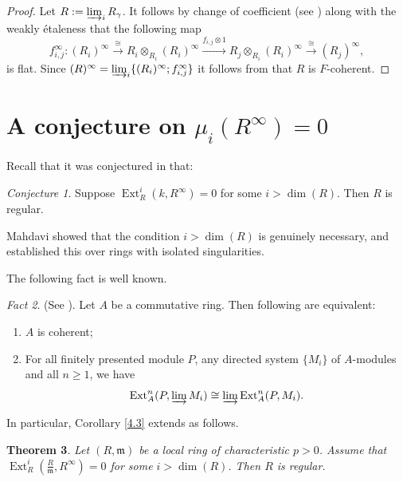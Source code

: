 \documentclass[11pt,a4paper]{amsart}
\numberwithin{equation}{section}
\newtheorem{theorem}{Theorem}[section]
\theoremstyle{definition}
\theoremstyle{remark}
\newtheorem{fact}[theorem]{Fact}
\newtheorem{conjecture}[theorem]{Conjecture}
\newcommand{\Ext}{\operatorname{Ext}}
\newcommand{\vil}{\operatornamewithlimits{\varinjlim}}
\newcommand{\lo}{\longrightarrow}
\begin{document}
\begin{proof}	Let \(R := \varinjlim_{i} R_\gamma\).
It follows by  change of coefficient (see \cite[page 46]{Mat}) along with the weakly \'etaleness that the following map \[f_{i,j}^\infty:(R_i)^\infty\stackrel{\cong}\lo R_i   \otimes_{R_i} {(R_i)^\infty}\stackrel{f_{i,j}\otimes1}\lo R_j\otimes_{R_i}(R_i)^\infty \stackrel{\cong}\lo(R_j)^\infty,\]
is flat. Since $(R)^\infty=\varinjlim_{i} \{(R_i)^\infty;f_{i,j}^\infty\}$
it follows from \cite[Theorem 2.3.3]{G1} that $R$ is \(F\)-coherent.
\end{proof}
\maketitle

\section{A conjecture on $\mu_i(R^\infty)=0$}


Recall that it was conjectured in  \cite[Conjecture 5.19]{Elham} that:

\begin{conjecture}\label{61}
Suppose \(
\operatorname{Ext}^{i }_{R}(k,R^\infty)=0\) for some $i>\dim(R)$.
Then	$R$ is  regular.

\end{conjecture} 
Mahdavi \cite{Elham} showed that the condition $i > \dim(R)$ is genuinely necessary, and established this over rings with isolated singularities. 

The following fact is well known.



\begin{fact}\label{comuf}(See \cite[Theorem~2.6.2]{G1}).
	Let $A$ be a commutative ring. Then following are equivalent:
	\begin{enumerate}
		\item[(i)]
		\(A \) is coherent;
		
		\item[(ii)] For all finitely presented  module $P$, any directed system $\{M_i\}$ of $A$-modules and all $n\geq 1$, we have $$\Ext^n_A(P,\vil M_i)\cong\vil\Ext^n_A(P,  M_i).$$
	\end{enumerate}
\end{fact}

In particular, Corollary \ref{4.3} extends as follows.

\begin{theorem}
	Let $(R,\mathfrak m)$ be a local ring of characteristic $p>0$. 
	Assume that
	\(
	\operatorname{Ext}^{i}_{R}\left(\frac{R}{\mathfrak m},R^{\infty}\right)=0
	\)
	for some $i>\dim(R)$. Then $R$ is regular.
\end{theorem}
\end{document}
